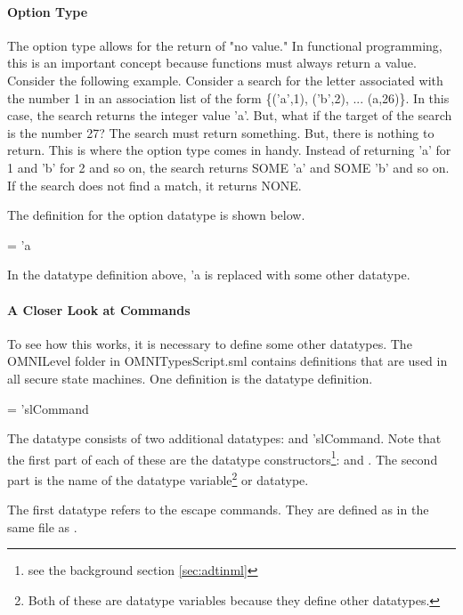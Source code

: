 \documentclass[../../main/main.tex]{subfiles}
\begin{document}
\paragraph*{Option Type}
The option type allows for the return of "no value."  In functional programming, this is an important concept because functions must always return a value.  Consider the following example.
Consider a search for the letter associated with the number 1 in an association list of the form \{('a',1), ('b',2), ... (a,26)\}. In this case, the search returns the integer value 'a'.  But, what if the target of the search is the number 27?  The search must return something.  But, there is nothing to return.  This is where the option type comes in handy.  Instead of returning 'a' for 1 and 'b' for 2 and so on, the search returns SOME 'a' and SOME 'b' and so on.  If the search does not find a match, it returns NONE.

The definition for the option datatype is shown below.

 =  \HOLTokenBar{}  'a

In the datatype definition above, 'a is replaced with some other datatype.  

\paragraph*{A Closer Look at Commands}
To see how this works, it is necessary to define some other datatypes. The OMNILevel folder in OMNITypesScript.sml contains definitions that are used in all secure state machines. One definition is the  datatype definition.

\begin{tabbing}
 =   \HOLTokenBar{}  'slCommand
\end{tabbing}

The  datatype consists of two additional datatypes:   and  'slCommand.  Note that the first part of each of these are the datatype constructors\footnote{see the background section \ref{sec:adtinml}}:  and .  The second part is the name of the datatype variable\footnote{Both of these are datatype variables because they define other datatypes.} or datatype.  

The first datatype refers to the escape commands.  They are defined as  in the same file as .
\end{document}
